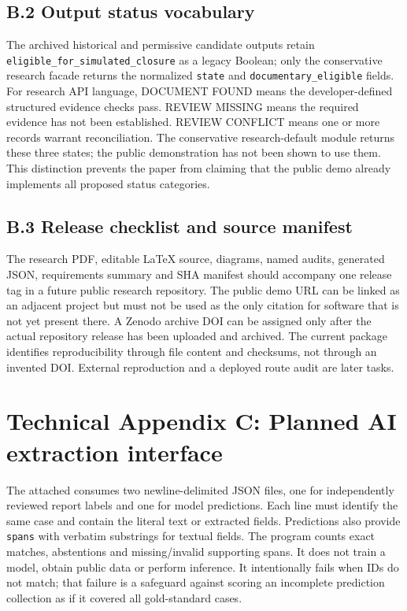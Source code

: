 \documentclass[11pt,twocolumn]{article}
\newcommand{\code}[1]{\texttt{#1}}
\newcommand{\stage}[1]{\textsf{#1}}
\begin{document}
\subsection*{B.2 Output status vocabulary}
The archived historical and permissive candidate outputs retain \code{eligible\_for\_simulated\_closure} as a legacy Boolean; only the conservative research facade returns the normalized \code{state} and \code{documentary\_eligible} fields. For research API language, \stage{DOCUMENT FOUND} means the developer-defined structured evidence checks pass. \stage{REVIEW MISSING} means the required evidence has not been established. \stage{REVIEW CONFLICT} means one or more records warrant reconciliation. The conservative research-default module returns these three states; the public demonstration has not been shown to use them. This distinction prevents the paper from claiming that the public demo already implements all proposed status categories.

\subsection*{B.3 Release checklist and source manifest}
The research PDF, editable \LaTeX{} source, diagrams, named audits, generated JSON, requirements summary and SHA manifest should accompany one release tag in a future public research repository. The public demo URL can be linked as an adjacent project but must not be used as the only citation for software that is not yet present there. A Zenodo archive DOI can be assigned only after the actual repository release has been uploaded and archived. The current package identifies reproducibility through file content and checksums, not through an invented DOI. External reproduction and a deployed route audit are later tasks.

\section*{Technical Appendix C: Planned AI extraction interface}\label{app:c}
The attached  consumes two newline-delimited JSON files, one for independently reviewed report labels and one for model predictions. Each line must identify the same case and contain the literal text or extracted fields. Predictions also provide \code{spans} with verbatim substrings for textual fields. The program counts exact matches, abstentions and missing/invalid supporting spans. It does not train a model, obtain public data or perform inference. It intentionally fails when IDs do not match; that failure is a safeguard against scoring an incomplete prediction collection as if it covered all gold-standard cases.
\end{document}
